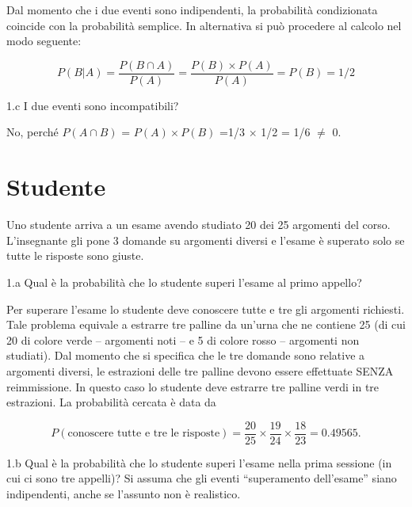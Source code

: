 \documentclass[
  11pt,
]{book}
\theoremstyle{mytheoremstyle}
\theoremstyle{mydefstyle}
\newenvironment{sol}
  {
  \begin{tcolorbox}[enhanced,breakable,arc=0.1mm,boxrule=1pt,colback=white,colframe=iblue,
  title=\bf \fontfamily{lmss}\selectfont \hspace{.5 cm} Soluzione,drop fuzzy shadow]

}{
\end{tcolorbox}
  }
\begin{document}
\begin{sol}
Dal momento che i due eventi sono indipendenti, la probabilità
condizionata coincide con la probabilità semplice.
In alternativa si può procedere al calcolo nel modo seguente:

\[P({B}|A)= \frac{P(B \cap A)}{P(A)} = \frac{P(B) \times P(A)}{P(A)} = P({B}) =1/2\]

\end{sol}

1.c I due eventi sono incompatibili?

\begin{sol}
No, perché \({P(A \cap B)}\) = \({P(A) \times P(B)}\) =1/3 \(\times\) 1/2 = 1/6 \(\neq\) 0.

\end{sol}

\section{Studente}\label{studente}

Uno studente arriva a un esame avendo studiato 20 dei 25
argomenti del corso.
L'insegnante gli pone 3 domande su argomenti diversi e
l'esame è superato solo se tutte le risposte sono giuste.

1.a Qual è la probabilità che lo studente
superi l'esame al primo appello?

\begin{sol}
Per superare l'esame lo studente deve conoscere tutte e
tre gli argomenti richiesti.
Tale problema equivale a estrarre tre palline da un'urna
che ne contiene 25 (di cui 20 di colore verde -- argomenti noti --
e 5 di colore rosso -- argomenti non studiati).
Dal momento che si specifica che le tre domande sono relative a
argomenti diversi, le estrazioni delle tre palline devono essere
effettuate SENZA reimmissione.
In questo caso lo studente deve estrarre
tre palline verdi in tre estrazioni.
La probabilità cercata è data da

\[
P(\mbox{conoscere tutte e tre le risposte})=
\frac{20}{25} \times \frac{19}{24} \times \frac{18}{23} = 0.49565  .
\]

\end{sol}

1.b Qual è la probabilità che lo studente superi
l'esame nella prima sessione (in cui ci sono tre appelli)?
Si assuma che gli eventi ``superamento dell'esame'' siano
indipendenti, anche se l'assunto non è realistico.
\end{document}
